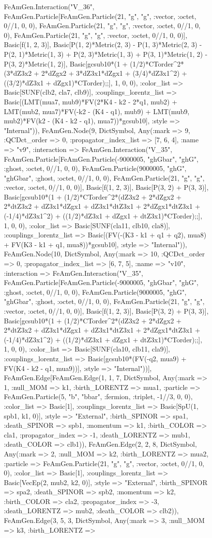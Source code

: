 \documentclass{revtex4}
\begin{document}
\begin{figure}[!htb]
\begin{center}
{FeAmGen.Interaction("V_36", FeAmGen.Particle[FeAmGen.Particle(21, "g", "g", :vector, :octet, 0//1, 0, 0), FeAmGen.Particle(21, "g", "g", :vector, :octet, 0//1, 0, 0), FeAmGen.Particle(21, "g", "g", :vector, :octet, 0//1, 0, 0)], Basic[f(1, 2, 3)], Basic[P(1, 2)*Metric(2, 3) - P(1, 3)*Metric(2, 3) - P(2, 1)*Metric(1, 3) + P(2, 3)*Metric(1, 3) + P(3, 1)*Metric(1, 2) - P(3, 2)*Metric(1, 2)], Basic[gcsub10*(1 + (1/2)*CTorder^2*(3*dZ3x2 + 2*dZgx2 + 3*dZ3x1*dZgx1 + (3/4)*dZ3x1^2) + ((3/2)*dZ3x1 + dZgx1)*CTorder);;], 1, 0, 0), :color_list => Basic[SUNF(clb2, cla7, clb9)], :couplings_lorentz_list => Basic[(LMT(mua7, mub9)*FV(2*K4 - k2 - 2*q1, mub2) + LMT(mub2, mua7)*FV(-k2 - (K4 - q1), mub9) + LMT(mub9, mub2)*FV(k2 - (K4 - k2 - q1), mua7))*gcsub10], :style => "Internal")), FeAmGen.Node(9, Dict{Symbol, Any}(:mark => 9, :QCDct_order => 0, :propagator_index_list => [7, 6, 4], :name => "v9", :interaction => FeAmGen.Interaction("V_35", FeAmGen.Particle[FeAmGen.Particle(-9000005, "ghGbar", "ghG", :ghost, :octet, 0//1, 0, 0), FeAmGen.Particle(9000005, "ghG", "ghGbar", :ghost, :octet, 0//1, 0, 0), FeAmGen.Particle(21, "g", "g", :vector, :octet, 0//1, 0, 0)], Basic[f(1, 2, 3)], Basic[P(3, 2) + P(3, 3)], Basic[gcsub10*(1 + (1/2)*CTorder^2*(dZ3x2 + 2*dZgx2 + 2*dtZ3x2 + dZ3x1*dZgx1 + dZ3x1*dtZ3x1 + 2*dZgx1*dtZ3x1 + (-1/4)*dZ3x1^2) + ((1/2)*dZ3x1 + dZgx1 + dtZ3x1)*CTorder);;], 1, 0, 0), :color_list => Basic[SUNF(cla11, clb10, cla8)], :couplings_lorentz_list => Basic[(FV(-(K3 - k1 + q1 + q2), mua8) + FV(K3 - k1 + q1, mua8))*gcsub10], :style => "Internal")), FeAmGen.Node(10, Dict{Symbol, Any}(:mark => 10, :QCDct_order => 0, :propagator_index_list => [6, 7, 5], :name => "v10", :interaction => FeAmGen.Interaction("V_35", FeAmGen.Particle[FeAmGen.Particle(-9000005, "ghGbar", "ghG", :ghost, :octet, 0//1, 0, 0), FeAmGen.Particle(9000005, "ghG", "ghGbar", :ghost, :octet, 0//1, 0, 0), FeAmGen.Particle(21, "g", "g", :vector, :octet, 0//1, 0, 0)], Basic[f(1, 2, 3)], Basic[P(3, 2) + P(3, 3)], Basic[gcsub10*(1 + (1/2)*CTorder^2*(dZ3x2 + 2*dZgx2 + 2*dtZ3x2 + dZ3x1*dZgx1 + dZ3x1*dtZ3x1 + 2*dZgx1*dtZ3x1 + (-1/4)*dZ3x1^2) + ((1/2)*dZ3x1 + dZgx1 + dtZ3x1)*CTorder);;], 1, 0, 0), :color_list => Basic[SUNF(cla10, clb11, cla9)], :couplings_lorentz_list => Basic[gcsub10*(FV(-q2, mua9) + FV(K4 - k2 - q1, mua9))], :style => "Internal"))], FeAmGen.Edge[FeAmGen.Edge(1, 1, 7, Dict{Symbol, Any}(:mark => 1, :null_MOM => k1, :birth_LORENTZ => mua1, :particle => FeAmGen.Particle(5, "b", "bbar", :fermion, :triplet, -1//3, 0, 0), :color_list => Basic[1], :couplings_lorentz_list => Basic[SpU(1, spb1, k1, 0)], :style => "External", :birth_SPINOR => spa1, :death_SPINOR => spb1, :momentum => k1, :birth_COLOR => cla1, :propagator_index => -1, :death_LORENTZ => mub1, :death_COLOR => clb1)), FeAmGen.Edge(2, 2, 8, Dict{Symbol, Any}(:mark => 2, :null_MOM => k2, :birth_LORENTZ => mua2, :particle => FeAmGen.Particle(21, "g", "g", :vector, :octet, 0//1, 0, 0), :color_list => Basic[1], :couplings_lorentz_list => Basic[VecEp(2, mub2, k2, 0)], :style => "External", :birth_SPINOR => spa2, :death_SPINOR => spb2, :momentum => k2, :birth_COLOR => cla2, :propagator_index => -3, :death_LORENTZ => mub2, :death_COLOR => clb2)), FeAmGen.Edge(3, 5, 3, Dict{Symbol, Any}(:mark => 3, :null_MOM => k3, :birth_LORENTZ => }
\end{center}
\end{figure}
\end{document}
